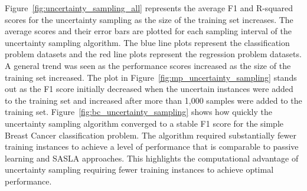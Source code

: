 \documentclass[conference]{IEEEtran}
\begin{document}
	Figure~\ref{fig:uncertainty_sampling_all} represents the average F1 and R-squared scores for the uncertainty sampling as the size of the training set increases. The average scores and their error bars are plotted for each sampling interval of the uncertainty sampling algorithm. The blue line plots represent the classification problem datasets and the red line plots represent the regression problem datasets. A general trend was seen as the performance scores increased as the size of the training set increased. The plot in Figure~\ref{fig:mp_uncertainty_sampling} stands out as the F1 score initially decreased when the uncertain instances were added to the training set and increased after more than 1,000 samples were added to the training set. Figure~\ref{fig:bc_uncertainty_sampling} shows how quickly the uncertainty sampling algorithm converged to a stable F1 score for the simple Breast Cancer classification problem. The algorithm required substantially fewer training instances to achieve a level of performance that is comparable to passive learning and SASLA approaches. This highlights the computational advantage of uncertainty sampling requiring fewer training instances to achieve optimal performance.
	
\end{document}
